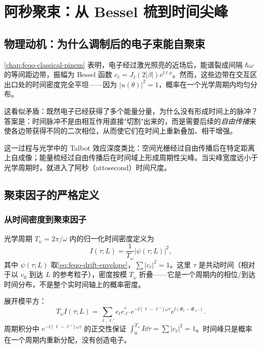 \section{阿秒聚束：从 Bessel 梳到时间尖峰}
\label{chap:feqo-attosecond}

\subsection{物理动机：为什么调制后的电子束能自聚束}

\cref{chap:feqo-classical-pinem} 表明，电子经过激光照亮的近场后，能谱裂成间隔 $\hbar\omega$ 的等间距边带，振幅为 Bessel 函数 $c_\ell=J_\ell(2|\beta|)e^{\ii\ell\phi}$。然而，这些边带在交互区出口处的时间密度完全平坦——因为 $|u(\theta)|^2=1$，概率在一个光学周期内均匀分布。

这看似矛盾：既然电子已经获得了多个能量分量，为什么没有形成时间上的脉冲？答案是：时间脉冲不是由相互作用直接"切割"出来的，而是需要后续的\emph{自由传播}来使各边带获得不同的二次相位，从而使它们在时间上重新叠加、相干增强。

这一过程与光学中的 Talbot 效应深度类比：空间光栅经过自由传播后在特定距离上自成像；能量梳经过自由传播后在时间域上形成周期性尖峰。当尖峰宽度远小于光学周期时，就进入了阿秒（attosecond）时间尺度。

\subsection{聚束因子的严格定义}

\subsubsection{从时间密度到聚束因子}

光学周期 $T_\omega=2\pi/\omega$ 内的归一化时间密度定义为
\begin{equation}
I(\tau;L)=\frac{1}{T_\omega}|\psi(\tau;L)|^2,
\label{eq:feqo-temporal-density-def}
\end{equation}
其中 $\psi(\tau;L)$ 取\cref{eq:feqo-drift-envelope}，$\sum|c_\ell|^2=1$。这里 $\tau$ 是共动时间（相对于以 $v_0$ 到达 $L$ 的参考粒子），密度按模 $T_\omega$ 折叠——它是一个周期内的相位/到达时间分布，不是整个实时间轴上的概率密度。

展开模平方：
\begin{equation}
T_\omega I(\tau;L)=\sum_{\ell,\ell'}c_\ell c_{\ell'}^*
e^{-\ii(\ell-\ell')\omega\tau}
e^{\ii(\Phi_\ell-\Phi_{\ell'})}.
\label{eq:feqo-temporal-density}
\end{equation}
周期积分中 $e^{-\ii(\ell-\ell')\omega\tau}$ 的正交性保证 $\int_0^{T_\omega}I\dd\tau=\sum|c_\ell|^2=1$。时间峰只是概率在一个周期内重新分配，没有创造电子。

